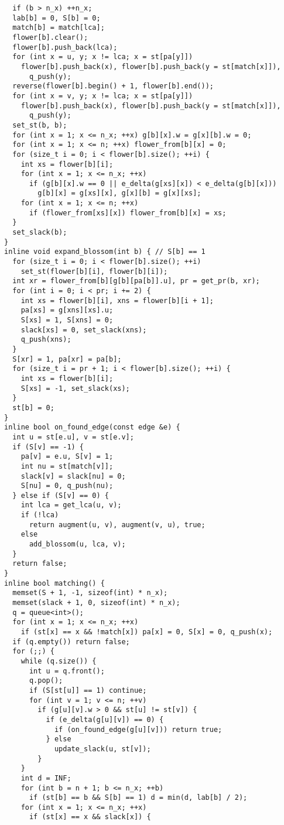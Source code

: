 \begin{lstlisting}
  if (b > n_x) ++n_x;
  lab[b] = 0, S[b] = 0;
  match[b] = match[lca];
  flower[b].clear();
  flower[b].push_back(lca);
  for (int x = u, y; x != lca; x = st[pa[y]])
    flower[b].push_back(x), flower[b].push_back(y = st[match[x]]),
      q_push(y);
  reverse(flower[b].begin() + 1, flower[b].end());
  for (int x = v, y; x != lca; x = st[pa[y]])
    flower[b].push_back(x), flower[b].push_back(y = st[match[x]]),
      q_push(y);
  set_st(b, b);
  for (int x = 1; x <= n_x; ++x) g[b][x].w = g[x][b].w = 0;
  for (int x = 1; x <= n; ++x) flower_from[b][x] = 0;
  for (size_t i = 0; i < flower[b].size(); ++i) {
    int xs = flower[b][i];
    for (int x = 1; x <= n_x; ++x)
      if (g[b][x].w == 0 || e_delta(g[xs][x]) < e_delta(g[b][x]))
        g[b][x] = g[xs][x], g[x][b] = g[x][xs];
    for (int x = 1; x <= n; ++x)
      if (flower_from[xs][x]) flower_from[b][x] = xs;
  }
  set_slack(b);
}
inline void expand_blossom(int b) { // S[b] == 1
  for (size_t i = 0; i < flower[b].size(); ++i)
    set_st(flower[b][i], flower[b][i]);
  int xr = flower_from[b][g[b][pa[b]].u], pr = get_pr(b, xr);
  for (int i = 0; i < pr; i += 2) {
    int xs = flower[b][i], xns = flower[b][i + 1];
    pa[xs] = g[xns][xs].u;
    S[xs] = 1, S[xns] = 0;
    slack[xs] = 0, set_slack(xns);
    q_push(xns);
  }
  S[xr] = 1, pa[xr] = pa[b];
  for (size_t i = pr + 1; i < flower[b].size(); ++i) {
    int xs = flower[b][i];
    S[xs] = -1, set_slack(xs);
  }
  st[b] = 0;
}
inline bool on_found_edge(const edge &e) {
  int u = st[e.u], v = st[e.v];
  if (S[v] == -1) {
    pa[v] = e.u, S[v] = 1;
    int nu = st[match[v]];
    slack[v] = slack[nu] = 0;
    S[nu] = 0, q_push(nu);
  } else if (S[v] == 0) {
    int lca = get_lca(u, v);
    if (!lca)
      return augment(u, v), augment(v, u), true;
    else
      add_blossom(u, lca, v);
  }
  return false;
}
inline bool matching() {
  memset(S + 1, -1, sizeof(int) * n_x);
  memset(slack + 1, 0, sizeof(int) * n_x);
  q = queue<int>();
  for (int x = 1; x <= n_x; ++x)
    if (st[x] == x && !match[x]) pa[x] = 0, S[x] = 0, q_push(x);
  if (q.empty()) return false;
  for (;;) {
    while (q.size()) {
      int u = q.front();
      q.pop();
      if (S[st[u]] == 1) continue;
      for (int v = 1; v <= n; ++v)
        if (g[u][v].w > 0 && st[u] != st[v]) {
          if (e_delta(g[u][v]) == 0) {
            if (on_found_edge(g[u][v])) return true;
          } else
            update_slack(u, st[v]);
        }
    }
    int d = INF;
    for (int b = n + 1; b <= n_x; ++b)
      if (st[b] == b && S[b] == 1) d = min(d, lab[b] / 2);
    for (int x = 1; x <= n_x; ++x)
      if (st[x] == x && slack[x]) {

\end{lstlisting}
